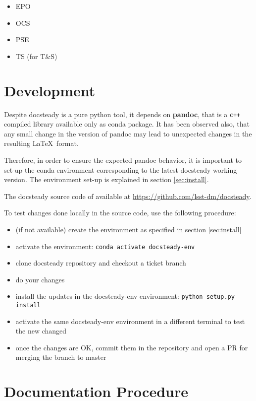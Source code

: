 \documentclass[DM]{lsstdoc}
\begin{document}
\begin{itemize}
\item EPO
\item OCS
\item PSE
\item TS (for T\&S)
\end{itemize}



\section{Development}
\label{sec:development}

Despite docsteady is a pure python tool, it depends on \textbf{pandoc}, that is a \texttt{c++} compiled library available only as conda package.
It has been observed also, that any small change in the version of pandoc may lead to unexpected changes in the resulting \LaTeX~format.

Therefore, in order to ensure the expected pandoc behavior, it is important to set-up the conda environment corresponding to the latest docsteady working version.
The environment set-up is explained in section \ref{sec:install}.

The docsteady source code of available at \url{https://github.com/lsst-dm/docsteady}.

To test changes done locally in the source code, use the following procedure:

\begin{itemize}
\item (if not available) create the environment as specified in section \ref{sec:install}
\item activate the environment: \texttt{conda activate docsteady-env}
\item clone docsteady repository and checkout a ticket branch
\item do your changes
\item install the updates in the docsteady-env environment: \texttt{python setup.py install}
\item activate the same docsteady-env environment in a different terminal to test the new changed
\item once the changes are OK, commit them in the repository and open a PR for merging the branch to master
\end{itemize}



\section{Documentation Procedure}
\label{sec:docproc}
\end{document}
